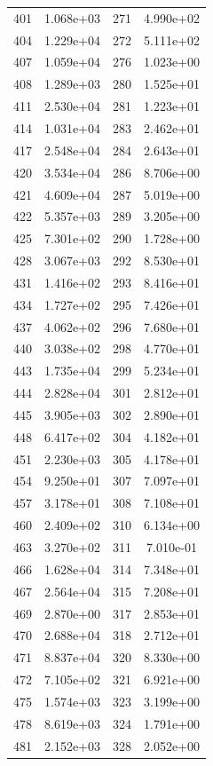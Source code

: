 \documentclass[12pt]{article}
\begin{document}
\begin{longtable}{@{}cccc@{}}
401 & 1.068e+03 & 271 & 4.990e+02 \\
404 & 1.229e+04 & 272 & 5.111e+02 \\
407 & 1.059e+04 & 276 & 1.023e+00 \\
408 & 1.289e+03 & 280 & 1.525e+01 \\
411 & 2.530e+04 & 281 & 1.223e+01 \\
414 & 1.031e+04 & 283 & 2.462e+01 \\
417 & 2.548e+04 & 284 & 2.643e+01 \\
420 & 3.534e+04 & 286 & 8.706e+00 \\
421 & 4.609e+04 & 287 & 5.019e+00 \\
422 & 5.357e+03 & 289 & 3.205e+00 \\
425 & 7.301e+02 & 290 & 1.728e+00 \\
428 & 3.067e+03 & 292 & 8.530e+01 \\
431 & 1.416e+02 & 293 & 8.416e+01 \\
434 & 1.727e+02 & 295 & 7.426e+01 \\
437 & 4.062e+02 & 296 & 7.680e+01 \\
440 & 3.038e+02 & 298 & 4.770e+01 \\
443 & 1.735e+04 & 299 & 5.234e+01 \\
444 & 2.828e+04 & 301 & 2.812e+01 \\
445 & 3.905e+03 & 302 & 2.890e+01 \\
448 & 6.417e+02 & 304 & 4.182e+01 \\
451 & 2.230e+03 & 305 & 4.178e+01 \\
454 & 9.250e+01 & 307 & 7.097e+01 \\
457 & 3.178e+01 & 308 & 7.108e+01 \\
460 & 2.409e+02 & 310 & 6.134e+00 \\
463 & 3.270e+02 & 311 & 7.010e-01 \\
466 & 1.628e+04 & 314 & 7.348e+01 \\
467 & 2.564e+04 & 315 & 7.208e+01 \\
469 & 2.870e+00 & 317 & 2.853e+01 \\
470 & 2.688e+04 & 318 & 2.712e+01 \\
471 & 8.837e+04 & 320 & 8.330e+00 \\
472 & 7.105e+02 & 321 & 6.921e+00 \\
475 & 1.574e+03 & 323 & 3.199e+00 \\
478 & 8.619e+03 & 324 & 1.791e+00 \\
481 & 2.152e+03 & 328 & 2.052e+00 \\

\end{longtable}
\end{document}
